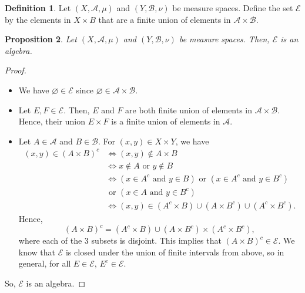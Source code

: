 \documentclass[a4paper, openany]{memoir}
\theoremstyle{definition}
\newtheorem{definition}{Definition}[section]
\theoremstyle{plain}
\newtheorem{proposition}[definition]{Proposition}
\begin{document}
    \begin{definition}
        Let $(X, \mathcal{A}, \mu)$ and $(Y, \mathcal{B}, \nu)$ be measure spaces. Define the set $\mathcal{E}$ by the elements in $X \times B$ that are a finite union of elements in $\mathcal{A} \times \mathcal{B}$.
    \end{definition}

    \begin{proposition}
        Let $(X, \mathcal{A}, \mu)$ and $(Y, \mathcal{B}, \nu)$ be measure spaces. Then, $\mathcal{E}$ is an algebra.
    \end{proposition}
    \begin{proof}
        \hspace*{0pt}
        \begin{itemize}
            \item We have $\varnothing \in \mathcal{E}$ since $\varnothing \in \mathcal{A} \times \mathcal{B}$.
            
            \item Let $E, F \in \mathcal{E}$. Then, $E$ and $F$ are both finite union of elements in $\mathcal{A} \times \mathcal{B}$. Hence, their union $E \times F$ is a finite union of elements in $\mathcal{A}$.
            
            \item Let $A \in \mathcal{A}$ and $B \in \mathcal{B}$. For $(x, y) \in X \times Y$, we have 
            \begin{align*}
                (x, y) \in (A \times B)^c &\iff (x, y) \not\in A \times B \\
                &\iff x \not\in A \textrm{ or } y \not\in B \\
                &\iff (x \in A^c \textrm{ and } y \in B) \textrm{ or } (x \in A^c \textrm{ and } y \in B^c) \\
                & \textrm{ or } (x \in A \textrm{ and } y \in B^c) \\
                &\iff (x, y) \in (A^c \times B) \cup (A \times B^c) \cup (A^c \times B^c).
            \end{align*}
            Hence,
            \[(A \times B)^c = (A^c \times B) \cup (A \times B^c) \times (A^c \times B^c),\]
            where each of the 3 subsets is disjoint. This implies that $(A \times B)^c \in \mathcal{E}$. We know that $\mathcal{E}$ is closed under the union of finite intervals from above, so in general, for all $E \in \mathcal{E}$, $E^c \in \mathcal{E}$.
        \end{itemize}
        So, $\mathcal{E}$ is an algebra.
    \end{proof}
\end{document}
